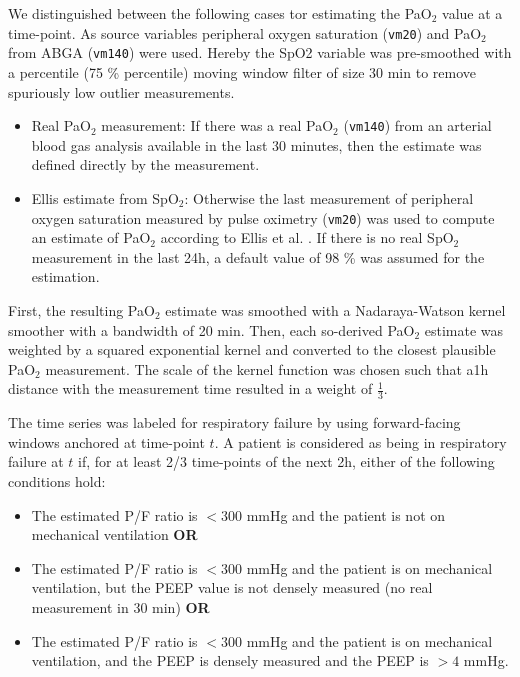 \documentclass{article}
\begin{document}
We distinguished between the following cases tor estimating the PaO$_2$ value at a time-point. As source variables peripheral oxygen saturation (\texttt{vm20}) and PaO$_2$ from ABGA (\texttt{vm140}) were used. Hereby the SpO2 variable was pre-smoothed with a percentile (75 \% percentile) moving window filter of size 30 min to remove spuriously low outlier measurements.

\begin{itemize}
    \item Real PaO$_2$ measurement: If there was a real PaO$_2$ (\texttt{vm140}) from an arterial blood gas analysis available in the last 30 minutes, then the estimate was defined directly by the measurement.
    \item Ellis estimate from SpO$_2$: Otherwise the last measurement of peripheral oxygen saturation measured by pulse oximetry (\texttt{vm20}) was used to compute an estimate of PaO$_2$ according to Ellis et al. \cite{ellis1989determination}. If there is no real SpO$_2$ measurement in the last 24h, a default value of 98 \% was assumed for the estimation.
\end{itemize}

First, the resulting PaO$_2$ estimate was smoothed with a Nadaraya-Watson kernel smoother with a bandwidth of 20 min. Then, each so-derived PaO$_2$ estimate was weighted by a squared exponential kernel and converted to the closest plausible PaO$_2$ measurement. The scale of the kernel function was chosen such that  a1h distance with the measurement time resulted in a weight of $\frac{1}{3}$.

The time series was labeled for respiratory failure by using forward-facing windows anchored at time-point $t$. A patient is considered as being in respiratory failure at $t$ if, for at least 2/3 time-points of the next 2h, either of the following conditions hold:

\begin{itemize}
    \item The estimated P/F ratio is $<300$ mmHg and the patient is not on mechanical ventilation \textbf{OR} \item The estimated P/F ratio is $<300$ mmHg and the patient is on mechanical ventilation, but the PEEP value is not densely measured (no real measurement in 30 min) \textbf{OR} 
\item The estimated P/F ratio is $<300$ mmHg and the patient is on mechanical ventilation, and the PEEP is densely measured and the PEEP is $>4$ mmHg.
\end{itemize}
\end{document}
